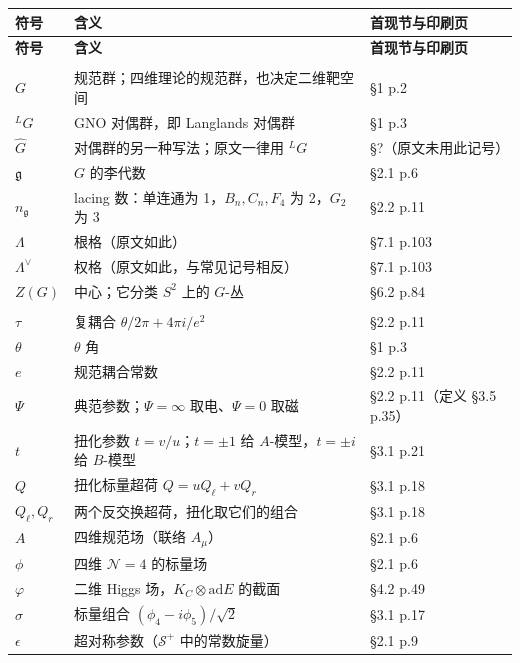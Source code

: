 \begin{longtable}{@{}p{3.4cm}p{7.4cm}p{4.3cm}@{}}
\toprule
\bfseries 符号 & \bfseries 含义 & \bfseries 首现节与印刷页 \\
\midrule
\endfirsthead
\toprule
\bfseries 符号 & \bfseries 含义 & \bfseries 首现节与印刷页 \\
\midrule
\endhead
\bottomrule
\endlastfoot

\multicolumn{3}{@{}l}{\bfseries 一、群、格与对偶}\\
\addlinespace[2pt]
$G$ & 规范群；四维理论的规范群，也决定二维靶空间 & \S1 p.2 \\
${}^LG$ & GNO 对偶群，即 Langlands 对偶群 & \S1 p.3 \\
$\hat G$ & 对偶群的另一种写法；原文一律用 ${}^LG$ & \S?（原文未用此记号） \\
$\mathfrak g$ & $G$ 的李代数 & \S2.1 p.6 \\
$n_{\mathfrak g}$ & lacing 数：单连通为 1，$B_n,C_n,F_4$ 为 2，$G_2$ 为 3 & \S2.2 p.11 \\
$\Lambda$ & 根格（原文如此） & \S7.1 p.103 \\
$\Lambda^\vee$ & 权格（原文如此，与常见记号相反） & \S7.1 p.103 \\
$Z(G)$ & 中心；它分类 $S^2$ 上的 $G$-丛 & \S6.2 p.84 \\
\addlinespace[4pt]
\multicolumn{3}{@{}l}{\bfseries 二、耦合、扭化与场}\\
\addlinespace[2pt]
$\tau$ & 复耦合 $\theta/2\pi+4\pi i/e^2$ & \S2.2 p.11 \\
$\theta$ & $\theta$ 角 & \S1 p.3 \\
$e$ & 规范耦合常数 & \S2.2 p.11 \\
$\Psi$ & 典范参数；$\Psi=\infty$ 取电、$\Psi=0$ 取磁 & \S2.2 p.11（定义 \S3.5 p.35） \\
$t$ & 扭化参数 $t=v/u$；$t=\pm1$ 给 $A$-模型，$t=\pm i$ 给 $B$-模型 & \S3.1 p.21 \\
$Q$ & 扭化标量超荷 $Q=uQ_\ell+vQ_r$ & \S3.1 p.18 \\
$Q_\ell,Q_r$ & 两个反交换超荷，扭化取它们的组合 & \S3.1 p.18 \\
$A$ & 四维规范场（联络 $A_\mu$） & \S2.1 p.6 \\
$\phi$ & 四维 $\mathcal N=4$ 的标量场 & \S2.1 p.6 \\
$\varphi$ & 二维 Higgs 场，$K_C\otimes\mathrm{ad}E$ 的截面 & \S4.2 p.49 \\
$\sigma$ & 标量组合 $(\phi_4-i\phi_5)/\sqrt2$ & \S3.1 p.17 \\
$\epsilon$ & 超对称参数（$\mathcal S^+$ 中的常数旋量） & \S2.1 p.9 \\

\end{longtable}

